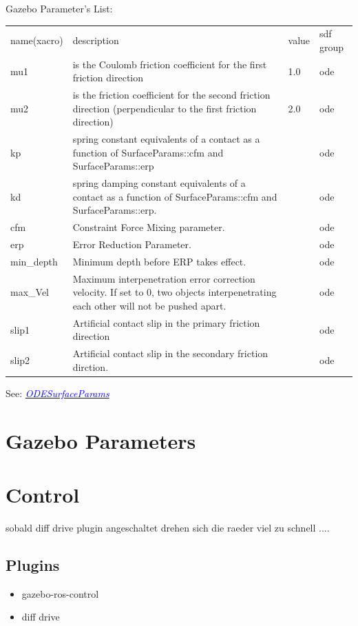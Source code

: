 \documentclass[twoside,colorback,accentcolor=tud4c,11pt]{tudreport}
\newcommand{\mylink}[2] {	\hyperlink{#1}{	\textit{\textcolor{blue}{#2}}}}
\begin{document}
Gazebo Parameter's List:\\
\begin{tabular}{l L{12cm} l l}
	name(xacro)&description&value&sdf group\\
	mu1&is the Coulomb friction coefficient for the first friction direction&1.0&ode\\
	mu2& is the friction coefficient for the second friction direction (perpendicular to the first friction direction)&2.0&ode\\
	kp&spring constant equivalents of a contact as a function of SurfaceParams::cfm and SurfaceParams::erp & &ode \\
	kd&spring damping constant equivalents of a contact as a function of SurfaceParams::cfm and SurfaceParams::erp.   & &ode \\
	cfm&Constraint Force Mixing parameter.& &ode \\
	erp&Error Reduction Parameter.& &ode \\
	min\_depth&Minimum depth before ERP takes effect.   & &ode \\
	max\_Vel& Maximum interpenetration error correction velocity.
	If set to 0, two objects interpenetrating each other will not be pushed apart.  & &ode \\
	slip1&Artificial contact slip in the primary friction direction  & &ode \\
	slip2&Artificial contact slip in the secondary friction dirction.& &ode \\
\end{tabular}

See: \mylink{http://osrf-distributions.s3.amazonaws.com/gazebo/api/dev/classgazebo_1_1physics_1_1ODESurfaceParams.html}{ODESurfaceParams}

\section{Gazebo Parameters}

	
	\section{Control}
	sobald diff drive plugin angeschaltet drehen sich die raeder viel zu schnell ....
	
	
	\subsection{Plugins}
	\begin{itemize}
		\item gazebo-ros-control
		\item diff drive
	\end{itemize}
	
\end{document}
